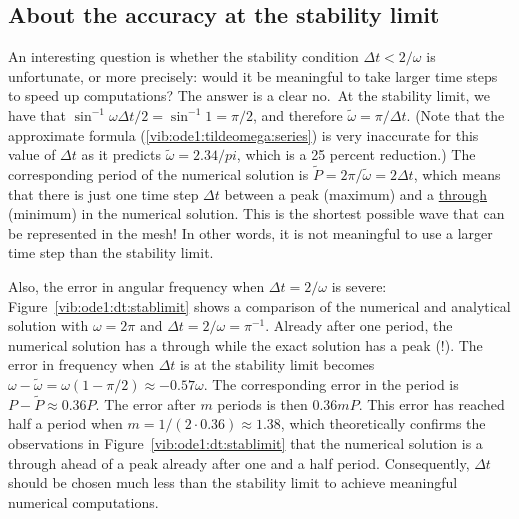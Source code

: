 \documentclass[%
oneside,                 %
final,                   %
10pt]{article}
\begin{document}
\subsection{About the accuracy at the stability limit}

An interesting question is whether the stability condition
$\Delta t < 2/\omega$ is unfortunate, or more precisely:
would it be meaningful to take larger time steps to speed up computations?
The answer is a clear no.~At the stability limit, we have that
$\sin^{-1}\omega\Delta t/2 = \sin^{-1} 1 = \pi/2$, and therefore
$\tilde\omega = \pi/\Delta t$. (Note that the approximate formula
(\ref{vib:ode1:tildeomega:series}) is very inaccurate for this
value of $\Delta t$ as it predicts $\tilde\omega = 2.34/pi$, which is
a 25 percent reduction.) The corresponding
period of the numerical solution
is $\tilde P=2\pi/\tilde\omega = 2\Delta t$, which means that there is
just one time step $\Delta t$ between a peak (maximum)
and a \href{{https://simple.wikipedia.org/wiki/Wave_(physics)}}{through}
(minimum) in the
numerical solution. This is the shortest possible wave that can be
represented in the mesh! In other words, it is not meaningful to
use a larger time step than the stability limit.

Also, the error in angular frequency
when $\Delta t = 2/\omega$ is severe: Figure~\ref{vib:ode1:dt:stablimit} shows a comparison of the numerical and
analytical solution with $\omega = 2\pi$ and
$\Delta t = 2/\omega = \pi^{-1}$. Already after one period, the
numerical solution has a through while the exact solution has a peak (!).
The error in frequency when $\Delta t$ is at the stability limit
becomes $\omega - \tilde\omega = \omega(1-\pi/2)\approx -0.57\omega$.
The corresponding error in the period is $P - \tilde P \approx 0.36P$.
The error after $m$ periods is then $0.36mP$. This error has reached
half a period when $m=1/(2\cdot 0.36)\approx 1.38$, which theoretically
confirms the observations in Figure~\ref{vib:ode1:dt:stablimit}
that the numerical solution is a through ahead of a peak already after
one and a half period. Consequently, $\Delta t$ should be chosen much
less than the stability limit to achieve meaningful numerical computations.
\end{document}
